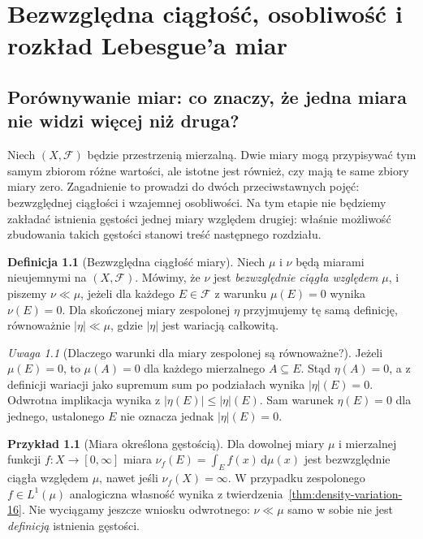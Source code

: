 \documentclass[11pt,a4paper,oneside]{book}
\numberwithin{equation}{chapter}
\theoremstyle{plain}
\theoremstyle{definition}
\newtheorem{definicja}[twierdzenie]{Definicja}
\newtheorem{przyklad}[twierdzenie]{Przykład}
\theoremstyle{remark}
\newtheorem{uwaga}[twierdzenie]{Uwaga}
\begin{document}


\chapter[Bezwzględna ciągłość i rozkład Lebesgue'a]{Bezwzględna ciągłość, osobliwość i rozkład Lebesgue'a miar}
\label{ch:ac-singular-17}

\section{Porównywanie miar: co znaczy, że jedna miara nie widzi więcej niż druga?}
Niech $(X,\mathcal F)$ będzie przestrzenią mierzalną. Dwie miary mogą
przypisywać tym samym zbiorom różne wartości, ale istotne jest również,
czy mają te same zbiory miary zero. Zagadnienie to prowadzi do dwóch
przeciwstawnych pojęć: bezwzględnej ciągłości i wzajemnej osobliwości.
Na tym etapie nie będziemy zakładać istnienia gęstości jednej miary
względem drugiej: właśnie możliwość zbudowania takich gęstości
stanowi treść następnego rozdziału.

\begin{definicja}[Bezwzględna ciągłość miary]
\label{def:ac-measure-17}
Niech $\mu$ i $\nu$ będą miarami nieujemnymi na $(X,\mathcal F)$.
Mówimy, że $\nu$ jest \emph{bezwzględnie ciągła względem $\mu$},
i piszemy $\nu\ll\mu$, jeżeli dla każdego $E\in\mathcal F$
z warunku $\mu(E)=0$ wynika $\nu(E)=0$.
Dla skończonej miary zespolonej $\eta$ przyjmujemy tę samą definicję,
równoważnie $|\eta|\ll\mu$, gdzie $|\eta|$ jest wariacją całkowitą.
\end{definicja}

\begin{uwaga}[Dlaczego warunki dla miary zespolonej są równoważne?]
Jeżeli $\mu(E)=0$, to $\mu(A)=0$ dla każdego mierzalnego $A\subseteq E$.
Stąd $\eta(A)=0$, a z definicji wariacji jako supremum sum po podziałach
wynika $|\eta|(E)=0$. Odwrotna implikacja wynika z
$|\eta(E)|\le|\eta|(E)$. Sam warunek $\eta(E)=0$ dla jednego,
ustalonego $E$ nie oznacza jednak $|\eta|(E)=0$.
\end{uwaga}

\begin{przyklad}[Miara określona gęstością]
\label{ex:ac-density-17}
Dla dowolnej miary $\mu$ i mierzalnej funkcji $f:X\to[0,\infty]$
miara $\nu_f(E)=\int_E f(x)\,\mathrm d\mu(x)$ jest bezwzględnie
ciągła względem $\mu$, nawet jeśli $\nu_f(X)=\infty$.
W przypadku zespolonego $f\in L^1(\mu)$ analogiczna własność
wynika z twierdzenia~\ref{thm:density-variation-16}.
Nie wyciągamy jeszcze wniosku odwrotnego: $\nu\ll\mu$
samo w sobie nie jest \emph{definicją} istnienia gęstości.
\end{przyklad}
\end{document}
